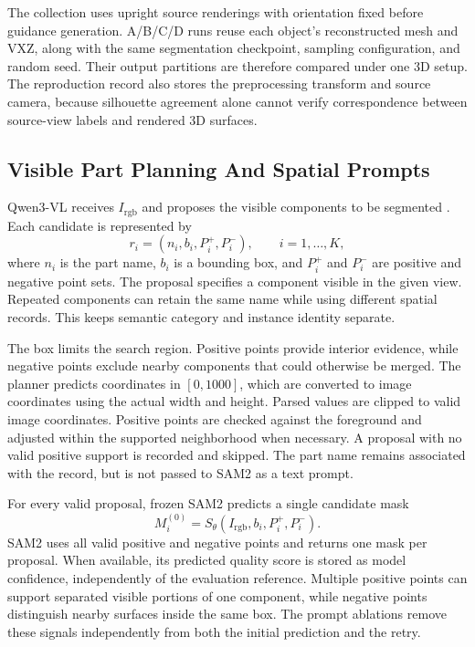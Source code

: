 \documentclass[pdflatex,iicol,sn-apa]{sn-jnl}
\begin{document}
The collection uses upright source renderings with orientation fixed before guidance generation. A/B/C/D runs reuse each object's reconstructed mesh and VXZ, along with the same segmentation checkpoint, sampling configuration, and random seed. Their output partitions are therefore compared under one 3D setup. The reproduction record also stores the preprocessing transform and source camera, because silhouette agreement alone cannot verify correspondence between source-view labels and rendered 3D surfaces.

\subsection{Visible Part Planning And Spatial Prompts}
Qwen3-VL receives $I_{\mathrm{rgb}}$ and proposes the visible components to be segmented \citep{bai2025qwen3vl}. Each candidate is represented by
\begin{equation}
r_i=(n_i,b_i,P_i^+,P_i^-),\qquad i=1,\ldots,K,
\label{eq:planning}
\end{equation}
where $n_i$ is the part name, $b_i$ is a bounding box, and $P_i^+$ and $P_i^-$ are positive and negative point sets. The proposal specifies a component visible in the given view. Repeated components can retain the same name while using different spatial records. This keeps semantic category and instance identity separate.

The box limits the search region. Positive points provide interior evidence, while negative points exclude nearby components that could otherwise be merged. The planner predicts coordinates in $[0,1000]$, which are converted to image coordinates using the actual width and height. Parsed values are clipped to valid image coordinates. Positive points are checked against the foreground and adjusted within the supported neighborhood when necessary. A proposal with no valid positive support is recorded and skipped. The part name remains associated with the record, but is not passed to SAM2 as a text prompt.

For every valid proposal, frozen SAM2 predicts a single candidate mask
\begin{equation}
M_i^{(0)}=S_{\theta}(I_{\mathrm{rgb}},b_i,P_i^+,P_i^-).
\label{eq:initialmask}
\end{equation}
SAM2 uses all valid positive and negative points and returns one mask per proposal. When available, its predicted quality score is stored as model confidence, independently of the evaluation reference. Multiple positive points can support separated visible portions of one component, while negative points distinguish nearby surfaces inside the same box. The prompt ablations remove these signals independently from both the initial prediction and the retry.
\end{document}
